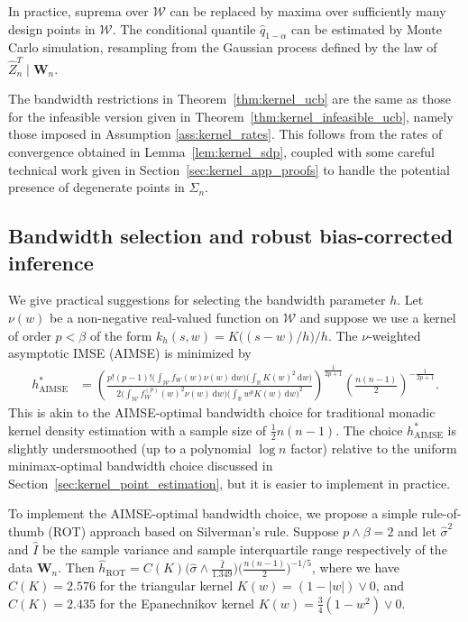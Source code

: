 \documentclass[11pt,lof]{puthesis}
\newcommand{\R}{\ensuremath{\mathbb{R}}}
\newcommand{\bW}{\ensuremath{\mathbf{W}}}
\newcommand{\cW}{\ensuremath{\mathcal{W}}}
\DeclareMathOperator{\AIMSE}{AIMSE}
\DeclareMathOperator{\ROT}{ROT}
\newcommand{\diff}[1]{\,\mathrm{d}#1}
\theoremstyle{break}
\theoremstyle{proof}
\begin{document}
In practice, suprema over $\cW$ can be replaced by maxima over sufficiently
many design points in $\cW$. The conditional quantile $\hat q_{1-\alpha}$ can
be estimated by Monte Carlo simulation, resampling from the Gaussian process
defined by the law of $\hat Z_n^T \mid \bW_n$.

The bandwidth restrictions in Theorem~\ref{thm:kernel_ucb} are the same as
those for the infeasible version given in
Theorem~\ref{thm:kernel_infeasible_ucb},
namely those imposed in Assumption \ref{ass:kernel_rates}. This follows from
the rates
of convergence obtained in Lemma~\ref{lem:kernel_sdp}, coupled with some careful
technical work given in Section~\ref{sec:kernel_app_proofs} to handle the
potential
presence of degenerate points in $\Sigma_n$.

\subsection{Bandwidth selection and robust bias-corrected inference}
\label{sec:kernel_bandwidth_selection}

We give practical suggestions for selecting the bandwidth parameter $h$.
Let $\nu(w)$ be a non-negative real-valued function on $\cW$ and suppose we use
a kernel of order $p < \beta$ of the form $k_h(s,w) = K\big((s-w) / h\big)/h$.
The $\nu$-weighted asymptotic IMSE (AIMSE) is minimized by
%
\begin{align*}
  h^*_{\AIMSE}
  &=
  \left(
    \frac{p!(p-1)!
      \Big(\int_\cW f_W(w) \nu(w) \diff{w}\Big)
    \Big(\int_\R K(w)^2 \diff{w}\Big)}
    {2 \Big(
        \int_{\cW}
        f_W^{(p)}(w)^2
        \nu(w)
        \diff{w}
      \Big)
      \Big(
        \int_\R
        w^p K(w)
        \diff{w}
      \Big)^2
    }
  \right)^{\frac{1}{2p+1}}
  \left( \frac{n(n-1)}{2} \right)^{-\frac{1}{2p+1}}.
\end{align*}
%
This is akin to the AIMSE-optimal bandwidth choice for traditional monadic
kernel density estimation with a sample size of $\frac{1}{2}n(n-1)$. The choice
$h^*_{\AIMSE}$ is slightly undersmoothed (up to a polynomial $\log n$ factor)
relative to the uniform minimax-optimal bandwidth choice discussed in
Section~\ref{sec:kernel_point_estimation}, but it is easier to implement in
practice.

To implement the AIMSE-optimal bandwidth choice, we propose a simple
rule-of-thumb (ROT) approach based on Silverman's rule.
Suppose $p\wedge\beta=2$ and let $\hat\sigma^2$ and $\hat I$
be the sample variance and sample interquartile range respectively
of the data $\bW_n$. Then
$\hat{h}_{\ROT} = C(K) \big( \hat\sigma \wedge
\frac{\hat I}{1.349} \big) \big(\frac{n(n-1)}{2} \big)^{-1/5}$,
where we have $C(K)=2.576$ for the triangular kernel $K(w) = (1 - |w|) \vee 0$,
and $C(K)=2.435$ for the Epanechnikov kernel
$K(w) = \frac{3}{4}(1 - w^2) \vee 0$.
\end{document}
